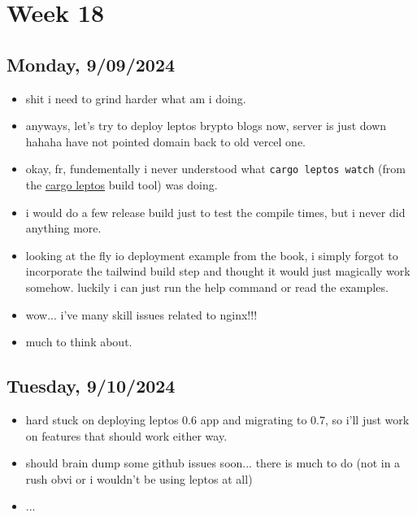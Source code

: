 \newpage
\section{Week 18}

\subsection*{Monday, 9/09/2024}
\begin{itemize}
    \item shit i need to grind harder what am i doing.
    \item anyways, let's try to deploy leptos brypto blogs now, server is just
        down hahaha have not pointed domain back to old vercel one.
    \item okay, fr, fundementally i never understood what \texttt{cargo leptos
        watch} (from the  
        \textcolor{blue}{\href{https://github.com/leptos-rs/cargo-leptos}{cargo leptos}}
        build tool) was doing.
    \item i would do a few release build just to test the compile times, but i
        never did anything more.
    \item looking at the fly io deployment example from the book, i simply
        forgot to incorporate the tailwind build step and thought it would just
        magically work somehow. luckily i can just run the help command or read
        the examples.
    \item wow... i've many skill issues related to nginx!!!
    \item much to think about.
\end{itemize}

\subsection*{Tuesday, 9/10/2024}
\begin{itemize}
    \item hard stuck on deploying leptos 0.6 app and migrating to 0.7, so i'll
        just work on features that should work either way.
    \item should brain dump some github issues soon... there is much to do (not 
        in a rush obvi or i wouldn't be using leptos at all)
    \item ...
\end{itemize}
